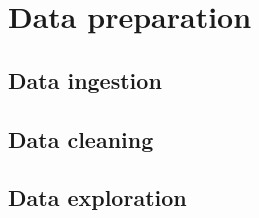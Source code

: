 \chapter{Data preparation}

\section{Data ingestion}

\section{Data cleaning}

\section{Data exploration}
